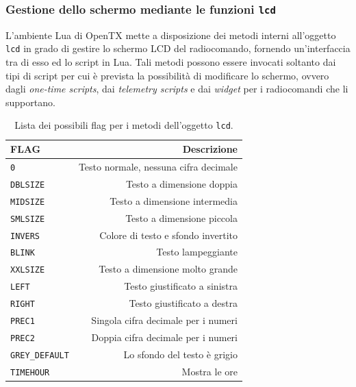 \documentclass[a4paper, 12pt]{report}
\begin{document}
\subsubsection{Gestione dello schermo mediante le funzioni \texttt{lcd}}
L'ambiente Lua di OpenTX mette a disposizione dei metodi interni all'oggetto \texttt{lcd} in grado di gestire lo schermo LCD del radiocomando, fornendo un'interfaccia tra di esso ed lo script in Lua. Tali metodi possono essere invocati soltanto dai tipi di script per cui è prevista la possibilità di modificare lo schermo, ovvero dagli \emph{one-time scripts}, dai \emph{telemetry scripts} e dai \emph{widget} per i radiocomandi che li supportano.

\begin{table}
        \begin{center}
                \begin{tabular}{|l|r|}
                        \hline
                        \textbf{FLAG} & \textbf{Descrizione}\\
                        \hline
                        \hline
                        \texttt{0} & Testo normale, nessuna cifra decimale\\
                        \hline
                        \texttt{DBLSIZE} & Testo a dimensione doppia\\
                        \hline
                        \texttt{MIDSIZE} & Testo a dimensione intermedia\\
                        \hline
                        \texttt{SMLSIZE} & Testo a dimensione piccola\\
                        \hline
                        \texttt{INVERS} & Colore di testo e sfondo invertito\\
                        \hline
                        \texttt{BLINK} & Testo lampeggiante\\
                        \hline
                        \texttt{XXLSIZE} & Testo a dimensione molto grande\\
                        \hline
                        \texttt{LEFT} & Testo giustificato a sinistra\\
                        \hline
                        \texttt{RIGHT} & Testo giustificato a destra\\
                        \hline
                        \texttt{PREC1} & Singola cifra decimale per i numeri\\
                        \hline
                        \texttt{PREC2} & Doppia cifra decimale per i numeri\\
                        \hline
                        \texttt{GREY\_DEFAULT} & Lo sfondo del testo è grigio\\
                        \hline
                        \texttt{TIMEHOUR} & Mostra le ore\\
                        \hline
                \end{tabular}
        \end{center}
        \caption{Lista dei possibili flag per i metodi dell'oggetto \texttt{lcd}.}
        \label{tab:elenco-flag-lcd}
\end{table}
\end{document}
